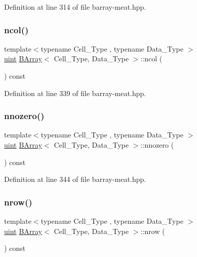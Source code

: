 Definition at line 314 of file barray-\/meat.\+hpp.

\mbox{\label{class_b_array_ac669bd57e3cbf4c60bf2b4a459dcdc4f}} 
\subsubsection{\texorpdfstring{ncol()}{ncol()}}
{\footnotesize\ttfamily template$<$typename Cell\+\_\+\+Type , typename Data\+\_\+\+Type $>$ \\
\hyperlink{typedefs_8hpp_a91ad9478d81a7aaf2593e8d9c3d06a14}{uint} \hyperlink{class_b_array}{B\+Array}$<$ Cell\+\_\+\+Type, Data\+\_\+\+Type $>$\+::ncol (\begin{DoxyParamCaption}{ }\end{DoxyParamCaption}) const\hspace{0.3cm}{\ttfamily [inline]}}



Definition at line 339 of file barray-\/meat.\+hpp.

\mbox{\label{class_b_array_a9910b6f42e37d3b0a12cafb70b78775f}} 
\subsubsection{\texorpdfstring{nnozero()}{nnozero()}}
{\footnotesize\ttfamily template$<$typename Cell\+\_\+\+Type , typename Data\+\_\+\+Type $>$ \\
\hyperlink{typedefs_8hpp_a91ad9478d81a7aaf2593e8d9c3d06a14}{uint} \hyperlink{class_b_array}{B\+Array}$<$ Cell\+\_\+\+Type, Data\+\_\+\+Type $>$\+::nnozero (\begin{DoxyParamCaption}{ }\end{DoxyParamCaption}) const\hspace{0.3cm}{\ttfamily [inline]}}



Definition at line 344 of file barray-\/meat.\+hpp.

\mbox{\label{class_b_array_ac829edf4a9921bd6b3f56afbcbb2f37f}} 
\subsubsection{\texorpdfstring{nrow()}{nrow()}}
{\footnotesize\ttfamily template$<$typename Cell\+\_\+\+Type , typename Data\+\_\+\+Type $>$ \\
\hyperlink{typedefs_8hpp_a91ad9478d81a7aaf2593e8d9c3d06a14}{uint} \hyperlink{class_b_array}{B\+Array}$<$ Cell\+\_\+\+Type, Data\+\_\+\+Type $>$\+::nrow (\begin{DoxyParamCaption}{ }\end{DoxyParamCaption}) const\hspace{0.3cm}{\ttfamily [inline]}}



